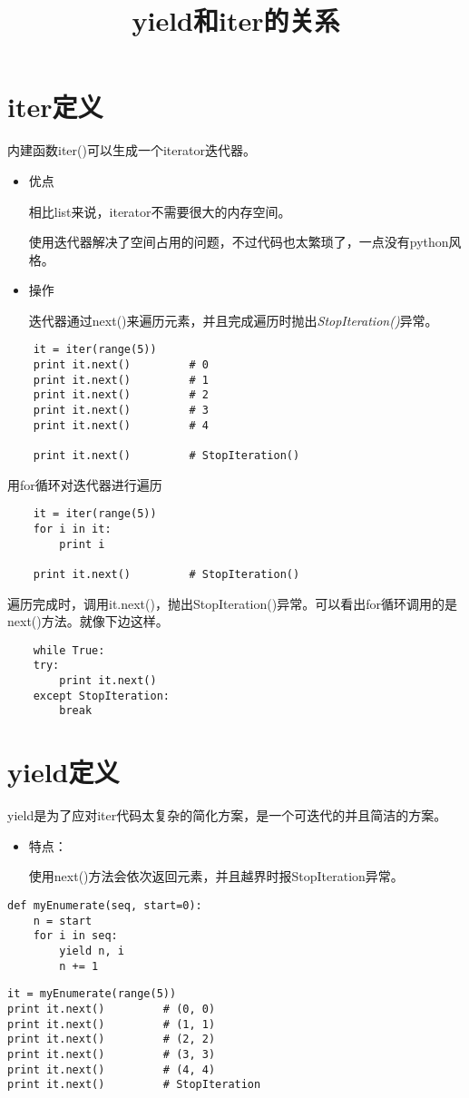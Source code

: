 \documentclass{article}
\title{yield和iter的关系}
\begin{document}
\maketitle
\section{iter定义}
{内建函数iter()可以生成一个iterator迭代器。
\begin{itemize}
    \item {优点
    
    
    相比list来说，iterator不需要很大的内存空间。
    
    
    使用迭代器解决了空间占用的问题，不过代码也太繁琐了，一点没有python风格。}
    \item {操作
    
    
    迭代器通过next()来遍历元素，并且完成遍历时抛出\emph{StopIteration()}异常。}
\end{itemize}}
\begin{lstlisting}
    it = iter(range(5))
    print it.next()         # 0
    print it.next()         # 1
    print it.next()         # 2
    print it.next()         # 3
    print it.next()         # 4

    print it.next()         # StopIteration()
\end{lstlisting}

\mbox{}

{用for循环对迭代器进行遍历
\begin{lstlisting}
    it = iter(range(5))
    for i in it:
        print i

    print it.next()         # StopIteration()
\end{lstlisting}}

\mbox{}

遍历完成时，调用it.next()，抛出StopIteration()异常。可以看出for循环调用的是next()方法。就像下边这样。
\begin{lstlisting}
    while True:
    try:
        print it.next()
    except StopIteration:
        break    
\end{lstlisting}

\section{yield定义}
yield是为了应对iter代码太复杂的简化方案，是一个可迭代的并且简洁的方案。
\begin{itemize}
    \item {特点：
    
    
    使用next()方法会依次返回元素，并且越界时报StopIteration异常。}
\end{itemize}
\begin{lstlisting}
def myEnumerate(seq, start=0):
    n = start
    for i in seq:
        yield n, i
        n += 1
\end{lstlisting}
\begin{lstlisting}
it = myEnumerate(range(5))
print it.next()         # (0, 0)
print it.next()         # (1, 1)
print it.next()         # (2, 2)
print it.next()         # (3, 3)
print it.next()         # (4, 4)
print it.next()         # StopIteration    
\end{lstlisting}
\end{document}
